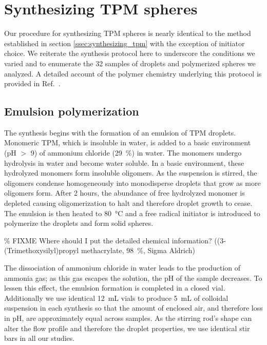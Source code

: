 \section{Synthesizing TPM spheres}

Our procedure for synthesizing TPM spheres is nearly identical to the
method established in section \ref{ssec:synthesizing_tpm} with the
exception of initiator choice. We reiterate the synthesis protocol
here to underscore the conditions we varied and to enumerate the
\num{32} samples of droplets and polymerized spheres we analyzed.
A detailed account of the polymer chemistry underlying this
protocol is provided in Ref.~\cite{vanderwel17}.

\subsection{Emulsion polymerization}

The synthesis begins with the formation of an emulsion of TPM droplets.
Monomeric TPM, which is insoluble in water, is added to a basic environment
(pH $>$ \num{9}) of ammonium chloride (\SI{29}{\percent}) in water.
The monomers undergo hydrolysis in water and become water soluble. 
In a basic environment, these hydrolyzed monomers form insoluble 
oligomers. As the suspension is stirred, the oligomers condense 
homogeneously into monodisperse droplets that grow as more oligomers form.
After \num{2} hours, the abundance of free hydrolyzed monomer is depleted
causing oligomerization to halt and therefore droplet growth to cease.
The emulsion is then heated to \SI{80}{\degreeCelsius} and a free radical 
initiator is introduced to polymerize the droplets and form solid spheres.

\% FIXME Where should I put the detailed chemical information?
((3-(Trimethoxysilyl)propyl methacrylate, \SI{98}{\percent}, Sigma Aldrich)

The dissociation of ammonium chloride in water leads to the production of ammonia
gas; as this gas escapes the solution, the pH of the sample decreases.
To lessen this effect, the emulsion formation is completed in a closed vial.
Additionally we use identical \SI{12}{\milli\liter} vials to produce \SI{5}{\milli\liter}
of colloidal suspension in each synthesis so that the amount of enclosed air, and therefore
loss in pH, are approximately equal across samples. As the stirring rod's shape can alter the
flow profile and therefore the droplet properties, we use identical stir bars in all our
studies.

